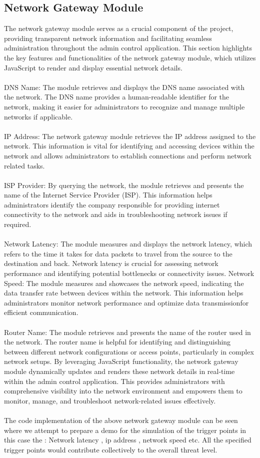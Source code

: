 \documentclass[letterpaper, 10 pt, conference]{ieeeconf}  %
\begin{document}
\subsection{Network Gateway Module}
The network gateway module serves as a crucial component of the project, providing transparent network information and facilitating seamless administration throughout the admin control application. This section highlights the key features and functionalities
of the network gateway module, which utilizes JavaScript to render and display essential network details. \\  \\DNS Name: The module retrieves and displays the DNS name associated with the network. The DNS name provides a human-readable identifier for the network, making it easier for administrators to recognize and manage multiple networks if
applicable. \\ \\ IP Address: The network gateway module retrieves the IP address assigned to the network. This information is vital for identifying and accessing devices within the network and allows administrators to establish connections and perform network related tasks. \\ \\ ISP Provider: By querying the network, the module retrieves and presents the name of the Internet Service Provider (ISP). This information helps administrators identify the company responsible for providing internet connectivity to the network and aids in troubleshooting network issues if required. \\ \\Network Latency: The module measures and displays the network latency, which refers to the time it takes for data packets to travel from the source to the destination and back. Network latency is crucial for assessing network performance and identifying potential bottlenecks or connectivity issues. Network Speed: The module measures and showcases the network speed, indicating the data transfer rate between devices within the network. This information helps
administrators monitor network performance and optimize data transmissionfor
efficient communication. \\ \\Router Name: The module retrieves and presents the name of the router used in the network. The router name is helpful for identifying and distinguishing between different network configurations or access points, particularly in complex network setups. By leveraging JavaScript functionality, the network gateway module dynamically updates and renders these network details in real-time within the admin control
application. This provides administrators with comprehensive visibility into the network environment and empowers them to monitor, manage, and troubleshoot
network-related issues effectively.\\ \\
The code implementation of the above network gateway module can be seen where we attempt to prepare a demo for the simulation of the trigger points in this case the : Network latency , ip address , network speed etc. All the specified trigger points would contribute collectively to the overall threat level.
\end{document}
